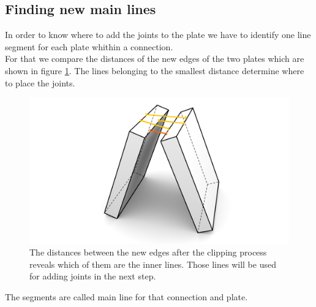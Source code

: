 \documentclass[../ClassicThesis.tex]{subfiles}
\begin{document}
\subsection{Finding new main lines}\label{mainLine}
In order to know where to add the joints to the plate we have to identify one line segment for each plate whithin a connection.\\
For that we compare the distances of the new edges of the two plates which are shown in figure \ref{fig:mainLinesAfterClipping}. The lines belonging to the smallest distance determine where to place the joints.
\begin{figure}[!ht]
\centering
\includegraphics[width=.5\columnwidth]{Images/Blocks_No_Touch.png}
\caption{The distances between the new edges after the clipping process reveals which of them are the inner lines. Those lines will be used for adding joints in the next step.}
\label{fig:mainLinesAfterClipping}
\end{figure}

The segments are called main line for that connection and plate.
\end{document}
